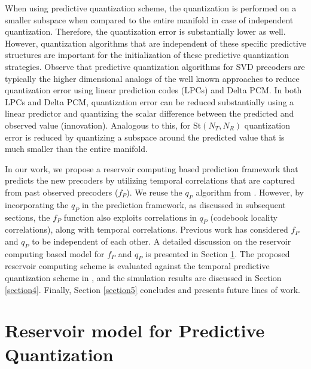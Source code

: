 \documentclass[conference]{IEEEtran}
\begin{document}
When using predictive quantization scheme, the quantization is performed on a smaller subspace when compared to the entire manifold in case of independent quantization.
Therefore, the quantization error is substantially lower as well.
However, quantization algorithms that are independent of these specific predictive structures are important for the initialization of these predictive quantization strategies.
Observe that predictive quantization algorithms for SVD precoders are typically the higher dimensional analogs of the well known approaches to reduce quantization error using linear prediction codes (LPCs) and Delta PCM.
In both LPCs and Delta PCM, quantization error can be reduced substantially using a linear predictor and quantizing the scalar difference between the predicted and observed value (innovation).
Analogous to this, for $\text{St}(N_T,N_R)$ quantization error is reduced by quantizing a subspace around the predicted value that is much smaller than the entire manifold.

In our work, we propose a reservoir computing based prediction framework that predicts the new precoders by utilizing  temporal correlations that are captured from past observed precoders ($f_P$).
We reuse the $q_P$ algorithm from \cite{Gupt1905:Predictive,6891198}.
However, by incorporating the $q_P$ in the prediction framework, as discussed in subsequent sections, the $f_P$ function also exploits correlations in $q_P$ (codebook locality correlations), along with temporal correlations.
Previous work \cite{Gupt1905:Predictive,6891198} has considered $f_P$ and $q_P$ to be independent of each other.
A detailed discussion on the reservoir computing based model for $f_P$ and $q_P$ is presented in Section \ref{section3}.
The proposed reservoir computing scheme is evaluated against the temporal predictive quantization scheme in \cite{6891198}, and the simulation results are discussed in Section \ref{section4}. Finally, Section \ref{section5} concludes and presents future lines of work.

\section{Reservoir model for Predictive Quantization}
\label{section3}
\end{document}
